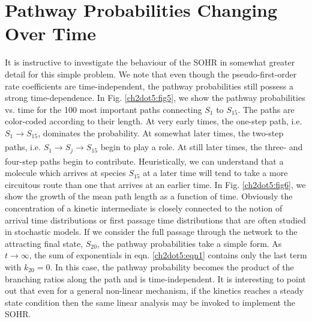 \section{Pathway Probabilities Changing Over Time}
\label{ch2dot5:sec:p_prob_time}
It is instructive to investigate the behaviour of the SOHR in somewhat greater detail
for this simple problem. We note that even though the pseudo-first-order rate coefficients
are time-independent, the pathway probabilities still possess a strong time-dependence.
In Fig. \ref{ch2dot5:fig5}, we show the pathway probabilities vs. time for the 100 most
important paths connecting $S_1$ to $S_{15}$. The paths are color-coded according to their
length. At very early times, the one-step path, i.e. $S_1 \xrightarrow[]{} S_{15}$, dominates the probability.
At somewhat later times, the two-step paths, i.e. $S_1 \xrightarrow[]{} S_j \xrightarrow[]{} S_{15}$ begin to play a role.
At still later times, the three- and four-step paths begin to contribute. Heuristically, we can understand that a molecule which arrives at species $S_{15}$ at a later time will tend to take a more circuitous route than one that arrives at an earlier time. In Fig. \ref{ch2dot5:fig6}, we
show the growth of the mean path length as a function of time. Obviously the concentration
of a kinetic intermediate is closely connected to the notion of arrival time distributions
or first passage time distributions that are often studied in stochastic models.\cite{ch1_IRPC_33_van1992stochastic} If we consider the full passage through the network to the attracting final state,
$S_{20}$, the pathway probabilities take a simple form. As $t \rightarrow \infty$, the sum of exponentials in eqn. \ref{ch2dot5:eqn1} contains only the last term with $k_{20} = 0$. In this case, the pathway
probability becomes the product of the branching ratios along the path and is time-independent.
It is interesting to point out that even for a general non-linear mechanism, if
the kinetics reaches a steady state condition then the same linear analysis may be
invoked to implement the SOHR.
